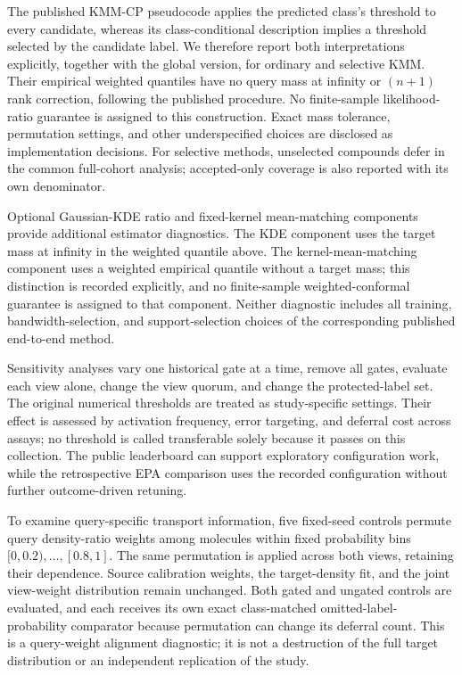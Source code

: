 \documentclass[11pt]{article}
\begin{document}
The published KMM-CP pseudocode applies the predicted class's threshold to every candidate, whereas its class-conditional description implies a threshold selected by the candidate label. We therefore report both interpretations explicitly, together with the global version, for ordinary and selective KMM. Their empirical weighted quantiles have no query mass at infinity or $(n+1)$ rank correction, following the published procedure. No finite-sample likelihood-ratio guarantee is assigned to this construction. Exact mass tolerance, permutation settings, and other underspecified choices are disclosed as implementation decisions. For selective methods, unselected compounds defer in the common full-cohort analysis; accepted-only coverage is also reported with its own denominator.

Optional Gaussian-KDE ratio and fixed-kernel mean-matching components provide additional estimator diagnostics. The KDE component uses the target mass at infinity in the weighted quantile above. The kernel-mean-matching component uses a weighted empirical quantile without a target mass; this distinction is recorded explicitly, and no finite-sample weighted-conformal guarantee is assigned to that component. Neither diagnostic includes all training, bandwidth-selection, and support-selection choices of the corresponding published end-to-end method.

Sensitivity analyses vary one historical gate at a time, remove all gates, evaluate each view alone, change the view quorum, and change the protected-label set. The original numerical thresholds are treated as study-specific settings. Their effect is assessed by activation frequency, error targeting, and deferral cost across assays; no threshold is called transferable solely because it passes on this collection. The public leaderboard can support exploratory configuration work, while the retrospective EPA comparison uses the recorded configuration without further outcome-driven retuning.

To examine query-specific transport information, five fixed-seed controls permute query density-ratio weights among molecules within fixed probability bins $[0,0.2),\ldots,[0.8,1]$. The same permutation is applied across both views, retaining their dependence. Source calibration weights, the target-density fit, and the joint view-weight distribution remain unchanged. Both gated and ungated controls are evaluated, and each receives its own exact class-matched omitted-label-probability comparator because permutation can change its deferral count. This is a query-weight alignment diagnostic; it is not a destruction of the full target distribution or an independent replication of the study.
\end{document}
